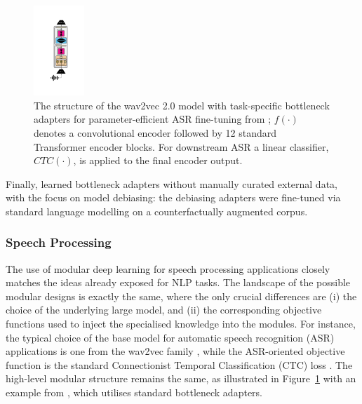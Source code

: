 \begin{figure}
  \begin{center}
    \includegraphics[width=0.17\textwidth]{img/wav2vec.pdf}
  \end{center}
  \caption{The structure of the wav2vec 2.0 model with task-specific bottleneck adapters for parameter-efficient ASR fine-tuning from \citet{Thomas:2022speech};
  $f(\cdot)$ denotes a convolutional encoder followed by 12 standard Transformer encoder blocks. For downstream ASR a linear classifier, $CTC(\cdot)$, is applied to the final encoder output.}
   \label{fig:app_speech}
\end{figure}

Finally, \citet{lauscher-etal-2021-sustainable-modular} learned bottleneck adapters without manually curated external data, with the focus on model debiasing: the debiasing adapters were fine-tuned via standard language modelling on a counterfactually augmented corpus. 





\subsubsection{Speech Processing}
\label{ss:speech}
The use of modular deep learning for speech processing applications closely matches the ideas already exposed for NLP tasks. The landscape of the possible modular designs is exactly the same, where the only crucial differences are (i) the choice of the underlying large model, and (ii) the corresponding objective functions used to inject the specialised knowledge into the modules. For instance, the typical choice of the base model for automatic speech recognition (ASR) applications is one from the wav2vec family \citep{Baevski:2020wav2vec,Babu:2022xlsr}, while the ASR-oriented objective function is the standard Connectionist Temporal Classification (CTC) loss \citep{Graves:2006ctc}. The high-level modular structure remains the same, as illustrated in Figure~\ref{fig:app_speech} with an example from \citet{Thomas:2022speech}, which utilises standard bottleneck adapters.

